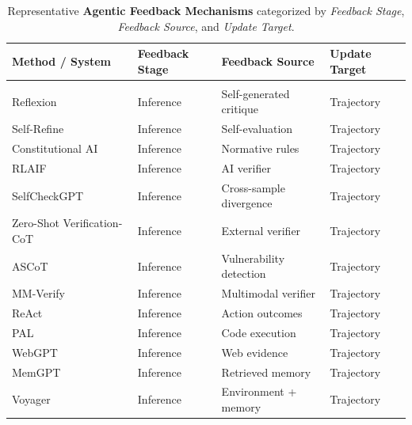 \begin{table}[!t]
\centering
\caption{Representative \textbf{Agentic Feedback Mechanisms} categorized by \textit{Feedback Stage}, \textit{Feedback Source}, and \textit{Update Target}.}
\renewcommand{\arraystretch}{1.15}
\setlength{\tabcolsep}{3pt}
\begin{tabular}{p{5.5cm}
  >{\centering\arraybackslash}p{3.8cm}
  >{\centering\arraybackslash}p{4.8cm}
  >{\centering\arraybackslash}p{3.3cm}}
\toprule
\textbf{Method / System} & \textbf{Feedback Stage} & \textbf{Feedback Source} & \textbf{Update Target} \\
\midrule

\rowcolor[HTML]{F5F5F5}
\multicolumn{4}{l}{\textbf{I. Reflective Feedback}} \\

Reflexion~\cite{shinn2023reflexion} & Inference & Self-generated critique & Trajectory \\
Self-Refine~\cite{madaan2023self} & Inference & Self-evaluation & Trajectory \\
Constitutional AI~\cite{bai2022constitutional} & Inference & Normative rules & Trajectory \\
RLAIF~\cite{lee2023rlaif} & Inference & AI verifier & Trajectory \\
SelfCheckGPT~\cite{manakul2023selfcheckgpt} & Inference & Cross-sample divergence & Trajectory \\
Zero-Shot Verification-CoT~\cite{chowdhury2025zeroshot} & Inference & External verifier & Trajectory \\
ASCoT~\cite{zhang2025ascot} & Inference & Vulnerability detection & Trajectory \\
MM-Verify~\cite{sun2025mmverify} & Inference & Multimodal verifier & Trajectory \\
ReAct~\cite{yao2023react} & Inference & Action outcomes & Trajectory \\
PAL~\cite{gao2023pal} & Inference & Code execution & Trajectory \\
WebGPT~\cite{nakano2021webgpt} & Inference & Web evidence & Trajectory \\
MemGPT~\cite{Packer2023MemGPTTL} & Inference & Retrieved memory & Trajectory \\
Voyager~\cite{wang2023voyager} & Inference & Environment + memory & Trajectory \\


\end{tabular}
\end{table}
